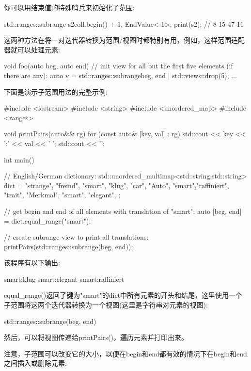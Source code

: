 你可以用结束值的特殊哨兵来初始化子范围:

\begin{cpp}
std::ranges::subrange s2{coll.begin() + 1, EndValue<-1>{}};
print(s2); // 8 15 47 11
\end{cpp}

这两种方法在将一对迭代器转换为范围/视图时都特别有用，例如，这样范围适配器就可以处理元素:

\begin{cpp}
void foo(auto beg, auto end)
{
	// init view for all but the first five elements (if there are any):
	auto v = std::ranges::subrange{beg, end} | std::views::drop(5);
	...
}
\end{cpp}

下面是演示子范围用法的完整示例:


\begin{cpp}
#include <iostream>
#include <string>
#include <unordered_map>
#include <ranges>

void printPairs(auto&& rg)
{
	for (const auto& [key, val] : rg) {
		std::cout << key << ':' << val << ' ';
	}
	std::cout << '\n';
}

int main()
{
	// English/German dictionary:
	std::unordered_multimap<std::string,std::string> dict = {
		{"strange", "fremd"},
		{"smart", "klug"},
		{"car", "Auto"},
		{"smart","raffiniert"},
		{"trait", "Merkmal"},
		{"smart", "elegant"},
	};
	
	// get begin and end of all elements with translation of "smart":
	auto [beg, end] = dict.equal_range("smart");
	
	// create subrange view to print all translations:
	printPairs(std::ranges::subrange(beg, end));
}
\end{cpp}

该程序有以下输出:

\begin{shell}
smart:klug smart:elegant smart:raffiniert
\end{shell}

equal\_range()返回了键为"smart"的dict中所有元素的开头和结尾，这里使用一个子范围将这两个迭代器转换为一个视图(这里是字符串对元素的视图):

\begin{cpp}
std::ranges::subrange(beg, end)
\end{cpp}

然后，可以将视图传递给printPairs()，遍历元素并打印出来。

注意，子范围可以改变它的大小，以便在begin和end都有效的情况下在begin和end之间插入或删除元素:

